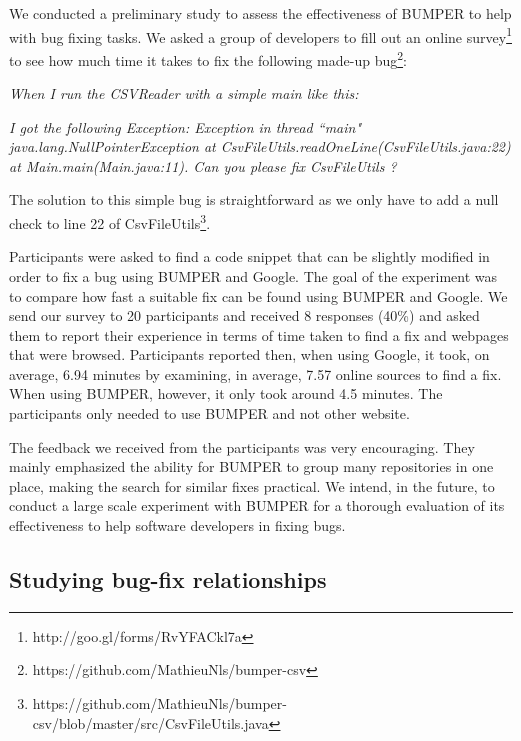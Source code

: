 \documentclass[conference]{IEEEtran}
\begin{document}
We conducted a preliminary study to assess the effectiveness of BUMPER to help with bug fixing tasks. We asked  a group of developers to fill out an online survey\footnote{http://goo.gl/forms/RvYFACkl7a} to see how much time it takes to fix the following made-up bug\footnote{https://github.com/MathieuNls/bumper-csv}: 

\textit{When I run the CSVReader with a simple main like this:}

\noindent\begin{minipage}{0.90\linewidth}

 

\end{minipage}

\textit{I got the following Exception: Exception in thread ``main" java.lang.NullPointerException at CsvFileUtils.readOneLine(CsvFileUtils.java:22) at Main.main(Main.java:11). Can you please fix CsvFileUtils ?}


The solution to this simple bug is straightforward as we only have to add a null check to line 22 of CsvFileUtils\footnote{https://github.com/MathieuNls/bumper-csv/blob/master/src/CsvFileUtils.java}.

Participants were asked to find a code snippet that can be slightly modified in order to fix a bug using BUMPER and Google. The goal of the experiment was to compare how fast a suitable fix can be found using BUMPER and Google.
We send our survey to 20 participants and received 8 responses (40\%) and asked them to report their experience in terms of time taken to find a fix and webpages that were browsed.
Participants reported then, when using Google, it took, on average, 6.94 minutes by examining, in average, 7.57 online sources to find a fix.
When using BUMPER, however, it only took around 4.5 minutes. The participants only needed to use BUMPER and not other website. 

The feedback we received from the participants was very encouraging. They mainly emphasized the ability for BUMPER to group many repositories in one place, making the search for similar fixes practical. We intend, in the future, to conduct a large scale experiment with BUMPER for a thorough evaluation of its effectiveness to help software developers in fixing bugs.

\subsection{Studying bug-fix relationships}
\label{subs:Studying bug-fix relationships}
\end{document}
